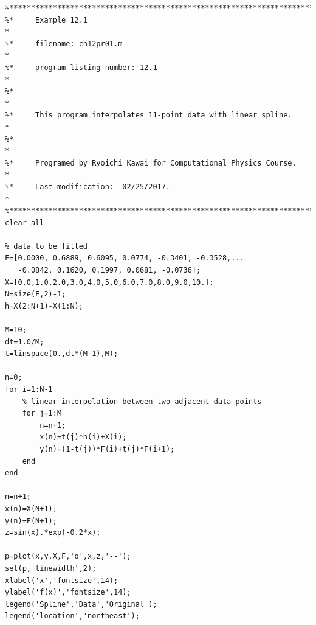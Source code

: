 \bigskip
\noindent

\footnotesize
\begin{verbatim}
%**************************************************************************
%*     Example 12.1                                                       *
%*     filename: ch12pr01.m                                               *
%*     program listing number: 12.1                                       *
%*                                                                        *
%*     This program interpolates 11-point data with linear spline.        *
%*                                                                        *
%*     Programed by Ryoichi Kawai for Computational Physics Course.       *
%*     Last modification:  02/25/2017.                                    *
%**************************************************************************
clear all

% data to be fitted
F=[0.0000, 0.6889, 0.6095, 0.0774, -0.3401, -0.3528,...
   -0.0842, 0.1620, 0.1997, 0.0681, -0.0736];
X=[0.0,1.0,2.0,3.0,4.0,5.0,6.0,7.0,8.0,9.0,10.];
N=size(F,2)-1;
h=X(2:N+1)-X(1:N);

M=10;
dt=1.0/M;
t=linspace(0.,dt*(M-1),M);

n=0;
for i=1:N-1
    % linear interpolation between two adjacent data points
    for j=1:M
        n=n+1;
        x(n)=t(j)*h(i)+X(i);
        y(n)=(1-t(j))*F(i)+t(j)*F(i+1);
    end
end

n=n+1;
x(n)=X(N+1);
y(n)=F(N+1);
z=sin(x).*exp(-0.2*x);

p=plot(x,y,X,F,'o',x,z,'--');
set(p,'linewidth',2);
xlabel('x','fontsize',14);
ylabel('f(x)','fontsize',14);
legend('Spline','Data','Original');
legend('location','northeast');
\end{verbatim}
\normalsize

